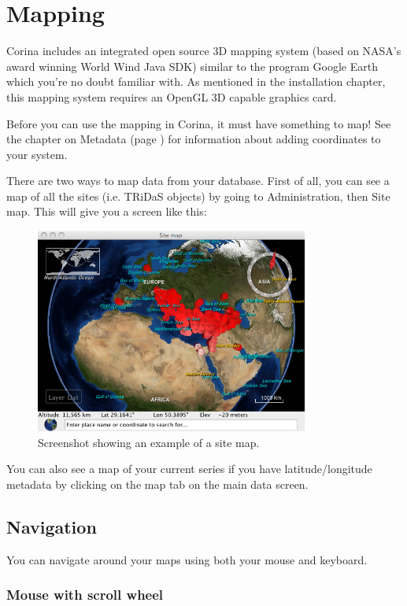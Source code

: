 \chapter{Mapping}
Corina includes an integrated open source 3D mapping system (based on NASA's award winning World Wind Java SDK) similar to the program Google Earth which you're no doubt familiar with. As mentioned in the installation chapter, this mapping system requires an OpenGL 3D capable graphics card. 

Before you can use the mapping in Corina, it must have something to map! See the chapter on Metadata (page \pageref{txt:metadata}) for information about adding coordinates to your system.

There are two ways to map data from your database. First of all, you can see a map of all the sites (i.e. TRiDaS objects) by going to Administration, then Site map. This will give you a screen like this:

\begin{figure}[hbtp]
  \caption{Screenshot showing an example of a site map.}
  \label{fig:map}
  \centering
    \includegraphics[width=0.8\textwidth]{Images/sitemap.png}
\end{figure}


You can also see a map of your current series if you have latitude/longitude metadata by clicking on the map tab on the main data screen. 

\section{Navigation}

You can navigate around your maps using both your mouse and keyboard.

\subsection{Mouse with scroll wheel}

